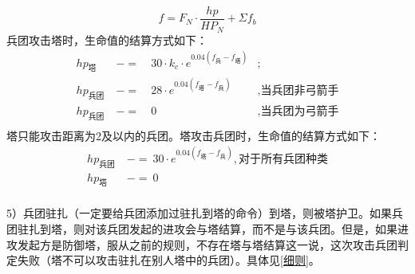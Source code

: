 \documentclass[a4paper,4pt]{article}
\begin{document}
\begin{equation}
	f = F_N \cdot \frac{hp}{HP_N} + \Sigma f_b\label{f}
\end{equation}
兵团攻击塔时，生命值的结算方式如下：
\begin{equation}
	\begin{aligned}
		hp_{\text{塔}}   & \ -= & \ 30 \cdot k_c \cdot e^{0.04(f_{\text{兵}}-f_{\text{塔}})} & ;                       \\
		hp_{\text{兵团}} & \ -= & \ 28 \cdot e^{0.04(f_{\text{塔}}-f_{\text{兵}})}           & , \text{当兵团非弓箭手} \\
		hp_{\text{兵团}} & \ -= & \ 0                                                        & , \text{当兵团为弓箭手} \\
	\end{aligned}
	\label{hp1}
\end{equation}
塔只能攻击距离为2及以内的兵团。塔攻击兵团时，生命值的结算方式如下：
\begin{equation}
	\begin{aligned}
		hp_{\text{兵团}} & \ -=\ 30 \cdot e^{0.04(f_{\text{塔}}-f_{\text{兵}})}, \text{对于所有兵团种类} \\
		hp_{\text{塔}}   & \ -=\ 0                                                                       \\
	\end{aligned}
	\label{hp2}
\end{equation}
\par
5）兵团驻扎（一定要给兵团添加过驻扎到塔的命令）到塔，则被塔护卫。如果兵团驻扎到塔，则对该兵团发起的进攻会与塔结算，而不是与该兵团。但是，如果进攻发起方是防御塔，服从之前的规则，不存在塔与塔结算这一说，这次攻击兵团判定失败（塔不可以攻击驻扎在别人塔中的兵团）。具体见\ref{细则}。\par
\end{document}
